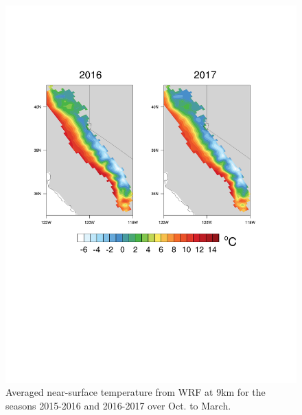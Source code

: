 \documentclass[draft,grl]{agutexSI}
\begin{document}
\begin{figure}
\begin{center}
\includegraphics[width=6in]{FigS4.pdf}
\caption{Averaged near-surface temperature from WRF at 9km for the seasons 2015-2016 and 2016-2017 over Oct. to March.}
\end{center}
\end{figure}
\end{document}
